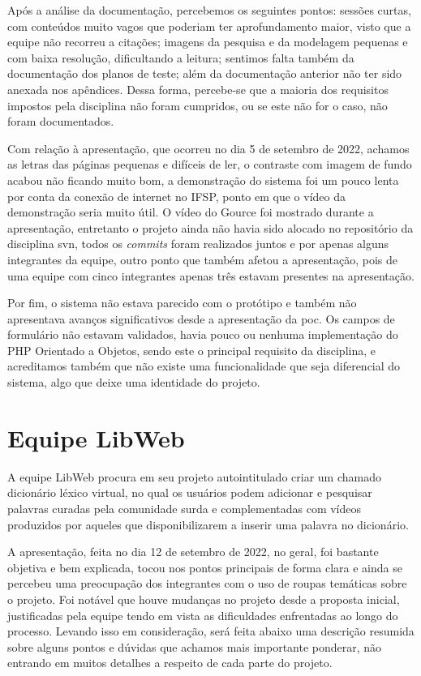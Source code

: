 Após a análise da documentação, percebemos os seguintes pontos: sessões curtas, com conteúdos muito vagos que poderiam ter aprofundamento maior, visto que a equipe não recorreu a citações; imagens da pesquisa e da modelagem pequenas e com baixa resolução, dificultando a leitura; sentimos falta também da documentação dos planos de teste; além da documentação anterior não ter sido anexada nos apêndices. Dessa forma, percebe-se que a maioria dos requisitos impostos pela disciplina não foram cumpridos, ou se este não for o caso, não foram documentados. 

Com relação à apresentação, que ocorreu no dia 5 de setembro de 2022, achamos as letras das páginas pequenas e difíceis de ler, o contraste com imagem de fundo acabou não ficando muito bom, a demonstração do sistema foi um pouco lenta por conta da conexão de internet no IFSP, ponto em que o vídeo da demonstração seria muito útil. O vídeo do Gource foi mostrado durante a apresentação, entretanto o projeto ainda não havia sido alocado no repositório da disciplina \acs{svn}, todos os \textit{commits} foram realizados juntos e por apenas alguns integrantes da equipe, outro ponto que também afetou a apresentação, pois de uma equipe com cinco integrantes apenas três estavam presentes na apresentação. 

Por fim, o sistema não estava parecido com o protótipo e também não apresentava avanços significativos desde a apresentação da \acs{poc}. Os campos de formulário não estavam validados, havia pouco ou nenhuma implementação do PHP Orientado a Objetos, sendo este o principal requisito da disciplina, e acreditamos também que não existe uma funcionalidade que seja diferencial do sistema, algo que deixe uma identidade do projeto. 

\section{Equipe LibWeb}
A equipe LibWeb procura em seu projeto autointitulado criar um chamado dicionário léxico virtual, no qual os usuários podem adicionar e pesquisar palavras curadas pela comunidade surda e complementadas com vídeos produzidos por aqueles que disponibilizarem a inserir uma palavra no dicionário. 

A apresentação, feita no dia 12 de setembro de 2022, no geral, foi bastante objetiva e bem explicada, tocou nos pontos principais de forma clara e ainda se percebeu uma preocupação dos integrantes com o uso de roupas temáticas sobre o projeto. Foi notável que houve mudanças no projeto desde a proposta inicial, justificadas pela equipe tendo em vista as dificuldades enfrentadas ao longo do processo. Levando isso em consideração, será feita abaixo uma descrição resumida sobre alguns pontos e dúvidas que achamos mais importante ponderar, não entrando em muitos detalhes a respeito de cada parte do projeto.

